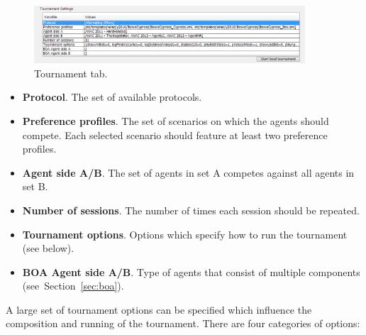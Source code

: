 \documentclass[]{article}
\begin{document}
\begin{figure}[htb]
	\centering
	\includegraphics[width=0.9\textwidth]{media/image16.png}
\caption{Tournament tab.}\label{Fig:tournament}
\end{figure}

\begin{itemize}
	\item \textbf{Protocol}. The set of available protocols.
	\item \textbf{Preference profiles}. The set of scenarios on which the agents should compete. Each selected scenario should feature at least two preference profiles.
	\item \textbf{Agent side A/B}. The set of agents in set A competes against all agents in set B.
	\item \textbf{Number of sessions}. The number of times each session should be repeated.
	\item \textbf{Tournament options}. Options which specify how to run the tournament (see below).
	\item \textbf{BOA Agent side A/B}. Type of agents that consist of multiple components (see~Section~\ref{sec:boa}).
\end{itemize}

A large set of tournament options can be specified which influence the composition and running of the tournament. There are four categories of options:
\end{document}
